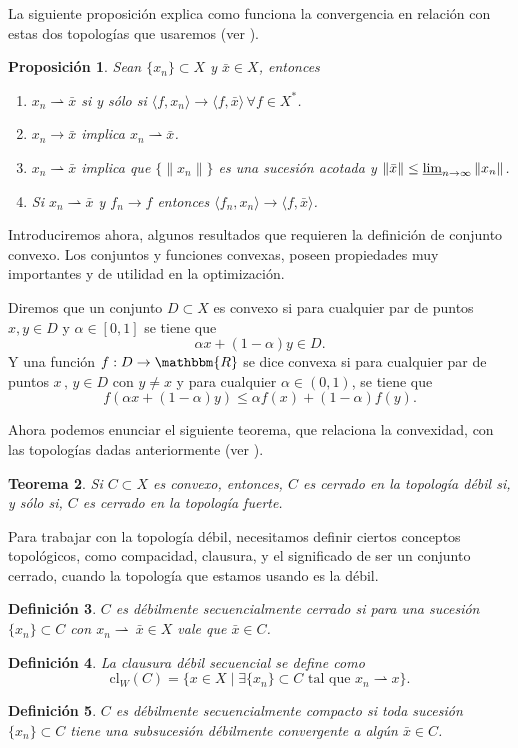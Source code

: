 \documentclass[a4paper,10pt]{book}
\newcommand{\R}{\mathbbm{R}}
\newcommand{\arr}{\rightarrow}
\newcommand{\bx}{\bar{x}}
\newcommand{\la}{\langle}
\newcommand{\ra}{\rangle}
\newcommand{\deb}{\rightharpoonup}
\newtheorem{teo}{Teorema}[section]
\newtheorem{prop}[teo]{Proposici\'on}
\newtheorem{defi}[teo]{Definici\'on}
\begin{document}
La siguiente proposición explica como funciona la convergencia en relación con estas dos topologías que usaremos (ver \cite[Proposition 3.5.]{brezis2010functional}).
\begin{prop}
 Sean $\{x_n\}\subset X$ y $\bx\in X$, entonces
 \begin{enumerate}
 \item $x_n\deb \bx$ si y sólo si $\la f,x_n\ra\to\la f,\bx\ra\,\forall f\in X^*$.
 \item $x_n\to \bx$ implica $x_n\deb \bx$.
 \item $x_n\deb\bx$ implica que $\{\|x_n\|\}$ es una sucesión acotada y $\|\bx\|\leq\varliminf_{n\to\infty}\|x_n\|$.
 \item Si $x_n\deb\bx$ y $f_n\to f$ entonces $\la f_n,x_n\ra\to\la f,\bx\ra$. 
 \end{enumerate}
\end{prop}

Introduciremos ahora, algunos resultados que requieren la definición de conjunto convexo.
Los conjuntos y funciones convexas, poseen propiedades muy importantes y de utilidad en la optimización.

Diremos que un conjunto $D\subset X$ es convexo si para cualquier par de puntos $x,y\in D$ y $\alpha\in[0,1]$ se tiene que $$\alpha x + (1-\alpha)y\in D.$$
Y una función $f:D\arr\R$ se dice convexa si para cualquier par de puntos $x\, ,\,y\in D$ con $y\neq x$ y para cualquier $\alpha\in (0,1)$, se tiene que $$f(\alpha x+(1-\alpha)y)\leq\alpha f(x)+(1-\alpha)f(y).$$

Ahora podemos enunciar el siguiente teorema, que relaciona la convexidad, con las topologías dadas anteriormente (ver \cite[Theorem 3.7.]{brezis2010functional}).

\begin{teo}
Si $C\subset X$ es convexo, entonces, $C$ es cerrado en la topología débil si, y sólo si, $C$ es cerrado en la topología fuerte.
\end{teo}

Para trabajar con la topología débil, necesitamos definir ciertos conceptos topológicos, como compacidad, clausura, y el significado de ser un conjunto cerrado, cuando la topología que estamos usando es la débil.

\begin{defi}
 $C$ es débilmente secuencialmente cerrado si para una sucesión $\{x_n\}\subset C$ con $x_n\deb~\bx\in X$ vale que $\bx\in C$.
\end{defi}
\begin{defi}
 La clausura débil secuencial se define como
 \[
\mathrm{cl}_W(C)=\{x\in X\mid \exists\{x_n\}\subset C\mbox{ tal que }x_n\deb x\}.  
 \]

\end{defi}
\begin{defi}
 $C$ es débilmente secuencialmente compacto si toda sucesión $\{x_n\}\subset C$ tiene una subsucesión débilmente convergente a algún $\bx\in C$.
\end{defi}
\end{document}

